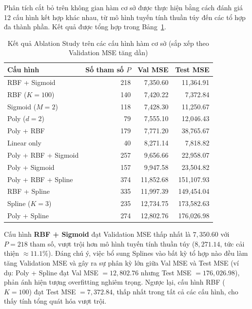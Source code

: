 Phân tích cắt bỏ trên không gian hàm cơ sở được thực hiện bằng cách
đánh giá 12 cấu hình kết hợp khác nhau, từ mô hình tuyến tính thuần túy
đến các tổ hợp đa thành phần. Kết quả được tổng hợp trong Bảng~\ref{tab:basis_ablation}.

\begin{table}[H]
\centering
\caption{Kết quả Ablation Study trên các cấu hình hàm cơ sở (sắp xếp theo Validation MSE tăng dần)}
\label{tab:basis_ablation}
\begin{tabular}{lrrr}
\hline
\textbf{Cấu hình} & \textbf{Số tham số $P$} & \textbf{Val MSE} & \textbf{Test MSE} \\
\hline
RBF + Sigmoid        & 218 & 7{,}350.60  & 11{,}364.91 \\
RBF ($K=100$)        & 140 & 7{,}420.22  & 7{,}372.84  \\
Sigmoid ($M=2$)      & 118 & 7{,}428.30  & 11{,}250.67 \\
Poly ($d=2$)         & 79  & 7{,}555.10  & 12{,}046.43 \\
Poly + RBF           & 179 & 7{,}771.20  & 38{,}765.67 \\
Linear only          & 40  & 8{,}271.14  & 7{,}818.82  \\
Poly + RBF + Sigmoid & 257 & 9{,}656.66  & 22{,}958.07 \\
Poly + Sigmoid       & 157 & 9{,}947.58  & 23{,}504.82 \\
Poly + RBF + Spline  & 374 & 11{,}852.68 & 151{,}107.93\\
RBF + Spline         & 335 & 11{,}997.39 & 149{,}454.04\\
Spline ($K=3$)       & 235 & 12{,}734.75 & 173{,}582.63\\
Poly + Spline        & 274 & 12{,}802.76 & 176{,}026.98\\
\hline
\end{tabular}
\end{table}

Cấu hình \textbf{RBF + Sigmoid} đạt Validation MSE thấp nhất là $7{,}350.60$
với $P=218$ tham số, vượt trội hơn mô hình tuyến tính thuần túy
($8{,}271.14$, tức cải thiện $\approx 11.1\%$). Đáng chú ý, việc bổ sung
Splines vào bất kỳ tổ hợp nào đều làm tăng Validation MSE và gây ra
sự phân kỳ lớn giữa Val MSE và Test MSE (ví dụ: Poly + Spline đạt
Val MSE $= 12{,}802.76$ nhưng Test MSE $= 176{,}026.98$), phản ánh
hiện tượng overfitting nghiêm trọng. Ngược lại, cấu hình RBF ($K=100$)
đạt Test MSE $= 7{,}372.84$, thấp nhất trong tất cả các cấu hình, cho
thấy tính tổng quát hóa vượt trội.

